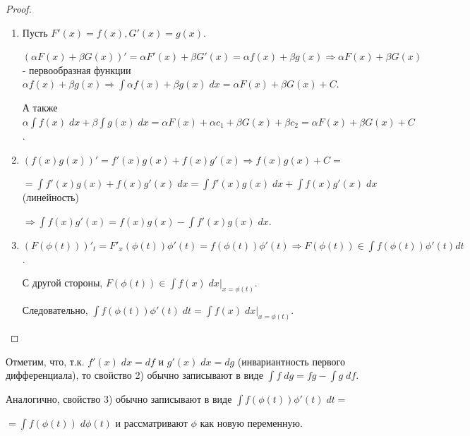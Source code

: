 	\begin{proof}
		\begin{enumerate}
			\item Пусть $F'(x) = f(x), G'(x) = g(x).$
			
			$(\alpha F(x) + \beta G(x))' = \alpha F'(x) + \beta G'(x) = \alpha f(x) + \beta g(x) \Rightarrow \alpha F(x) + \beta G(x)$ - первообразная функции $\alpha f(x) + \beta g(x) \Rightarrow \displaystyle\int \alpha f(x) + \beta g(x) \; dx = \alpha F(x) + \beta G(x) + C$.
					
			А также $\alpha \displaystyle\int f(x) \; dx + \beta \displaystyle\int g(x) \; dx = \alpha F(x) + \alpha c_1 + \beta G(x) + \beta c_2 = \alpha F(x) + \beta G(x) + C$.
			
			\item $(f(x)g(x))' = f'(x)g(x) + f(x)g'(x) \Rightarrow f(x)g(x) + C =$
			
			$=\displaystyle\int f'(x)g(x) + f(x)g'(x) \; dx = \displaystyle\int f'(x)g(x) \; dx + \displaystyle\int f(x)g'(x) \; dx$ (линейность)
			
			$\Rightarrow \displaystyle\int f(x)g'(x) = f(x)g(x) - \displaystyle\int f'(x)g(x) \; dx$.
			
			\item $(F(\phi(t)))'_t = F'_x(\phi(t))\phi'(t) = f(\phi(t))\phi'(t) \Rightarrow F(\phi(t)) \in \displaystyle\int f(\phi(t))\phi'(t)dt$.
			
			С другой стороны, $F(\phi(t)) \in \displaystyle\int f(x) \; dx \bigg|_{x=\phi(t)}$.
			
			Следовательно, $\displaystyle\int f(\phi(t))\phi'(t) \; dt = \displaystyle\int f(x) \; dx\bigg|_{x=\phi(t)}$.
		\end{enumerate}		
    \end{proof}
    
    \begin{mention}
    	Отметим, что, т.к. $f'(x) \; dx = df$ и $g'(x) \; dx = dg$ (инвариантность первого дифференциала), то свойство 2) обычно записывают в виде $\displaystyle\int f \; dg = fg - \displaystyle\int g \; df$.
    	
    	Аналогично, свойство 3) обычно записывают в виде $\displaystyle\int f(\phi(t))\phi'(t) \; dt =$    	
    	
    	$= \displaystyle\int f(\phi(t)) \; d\phi(t)$ и рассматривают $\phi$ как новую переменную.
    \end{mention}
    
